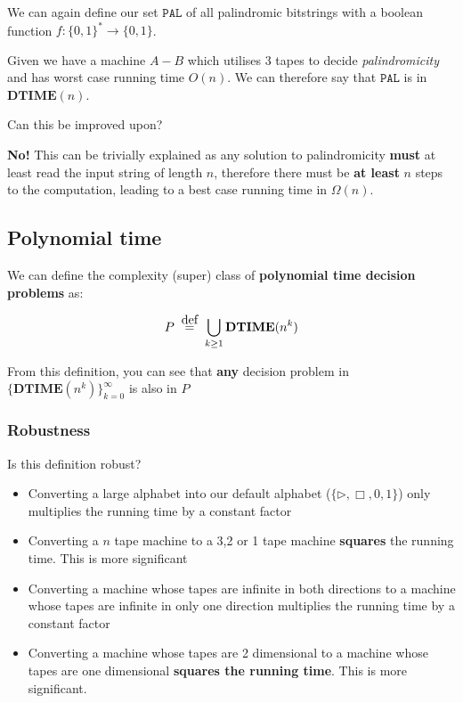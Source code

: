 \documentclass{article}
\newcommand\defeq{\stackrel{\mathclap{\normalfont\mbox{def}}}{=}}
\begin{document}
We can again define our set $\texttt{PAL} $ of all palindromic bitstrings with a boolean function $f: \{ 0,1 \}^{*}\rightarrow \{ 0,1 \} $.

Given we have a machine $A-B$ which utilises 3 tapes to decide \textit{palindromicity}  and has worst case running time $O(n)$. We can therefore say that $\texttt{PAL} $ is in $\mathbf{DTIME} (n)$.

Can this be improved upon?

\textbf{No!} This can be trivially explained as any solution to palindromicity \textbf{must} at least read the input string of length $n$, therefore there must be \textbf{at least} $n$ steps to the computation, leading to a best case running time in $\Omega(n)$.

\subsection{Polynomial time}

We can define the complexity (super) class of \textbf{polynomial time decision problems} as:

\[
  P \;\; \defeq \;\; \bigcup_{k\geq1}\mathbf{DTIME} (n^{k})
\]

From this definition, you can see that \textbf{any} decision problem in $\{  \mathbf{DTIME} (n^{k})\}_{k=0}^{\infty} $ is also in $P$

\subsubsection{Robustness}

Is this definition robust?

\begin{itemize}
  \item Converting a large alphabet into our default alphabet ($\{ \rhd, \Box, 0,1 \} $) only multiplies the running time by a constant factor
  \item Converting a $n$ tape machine to a 3,2 or 1 tape machine \textbf{squares} the running time. This is more significant
  \item Converting a machine whose tapes are infinite in both directions to a machine whose tapes are infinite in only one direction multiplies the running time by a constant factor
        \item Converting a machine whose tapes are 2 dimensional to a machine whose tapes are one dimensional \textbf{squares the running time}. This is more significant.
\end{itemize}
\end{document}

